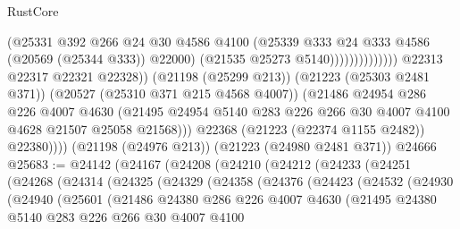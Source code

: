 \begin{lexlean}{RustCore}
\begin{coremodule}
                                          (@25331
                                            @392
                                            @266
                                            @24
                                            @30
                                            @4586
                                            @4100
                                            (@25339
                                              @333
                                              @24
                                              @333
                                              @4586
                                              (@20569 (@25344 @333))
                                              @22000)
                                            (@21535 @25273 @5140))))))))))))))
                  @22313
                  @22317
                  @22321
                  @22328))
              (@21198 (@25299 @213))
              (@21223 (@25303 @2481 @371))
              (@20527 (@25310 @371 @215 @4568 @4007))
              (@21486
                @24954
                @286
                @226
                @4007
                @4630
                (@21495 @24954 @5140 @283 @226 @266 @30 @4007 @4100 @4628 @21507 @25058 @21568)))
            @22368
            (@21223 (@22374 @1155 @2482))
            @22380))))
    (@21198 (@24976 @213))
    (@21223 (@24980 @2481 @371))
    @24666
@25683 := @24142
    (@24167
      (@24208
        (@24210
          (@24212
            (@24233
              (@24251
                (@24268
                  (@24314
                    (@24325
                      (@24329
                        (@24358
                          (@24376
                            (@24423
                              (@24532
                                (@24930
                                  (@24940
                                    (@25601
                                      (@21486
                                        @24380
                                        @286
                                        @226
                                        @4007
                                        @4630
                                        (@21495
                                          @24380
                                          @5140
                                          @283
                                          @226
                                          @266
                                          @30
                                          @4007
                                          @4100

\end{coremodule}
\end{lexlean}
